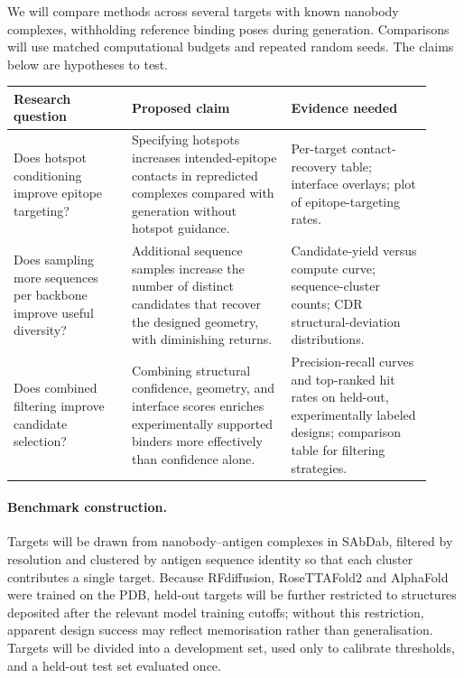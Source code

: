 We will compare methods across several targets with known nanobody complexes, withholding reference binding poses during generation. Comparisons will use matched computational budgets and repeated random seeds. The claims below are hypotheses to test.

\begin{center}
\small
\begin{tabular}{@{}p{0.26\linewidth} p{0.35\linewidth} p{0.31\linewidth}@{}}
\toprule
\textbf{Research question} & \textbf{Proposed claim} & \textbf{Evidence needed} \\
\midrule
Does hotspot conditioning improve epitope targeting? & Specifying hotspots increases intended-epitope contacts in repredicted complexes compared with generation without hotspot guidance. & Per-target contact-recovery table; interface overlays; plot of epitope-targeting rates. \\
\addlinespace
Does sampling more sequences per backbone improve useful diversity? & Additional sequence samples increase the number of distinct candidates that recover the designed geometry, with diminishing returns. & Candidate-yield versus compute curve; sequence-cluster counts; CDR structural-deviation distributions. \\
\addlinespace
Does combined filtering improve candidate selection? & Combining structural confidence, geometry, and interface scores enriches experimentally supported binders more effectively than confidence alone. & Precision-recall curves and top-ranked hit rates on held-out, experimentally labeled designs; comparison table for filtering strategies. \\
\bottomrule
\end{tabular}
\end{center}

\paragraph{Benchmark construction.} Targets will be drawn from nanobody--antigen
complexes in SAbDab, filtered by resolution and clustered by antigen sequence
identity so that each cluster contributes a single target. Because RFdiffusion,
RoseTTAFold2 and AlphaFold were trained on the PDB, held-out targets will be
further restricted to structures deposited after the relevant model training
cutoffs; without this restriction, apparent design success may reflect
memorisation rather than generalisation. Targets will be divided into a
development set, used only to calibrate thresholds, and a held-out test set
evaluated once.

